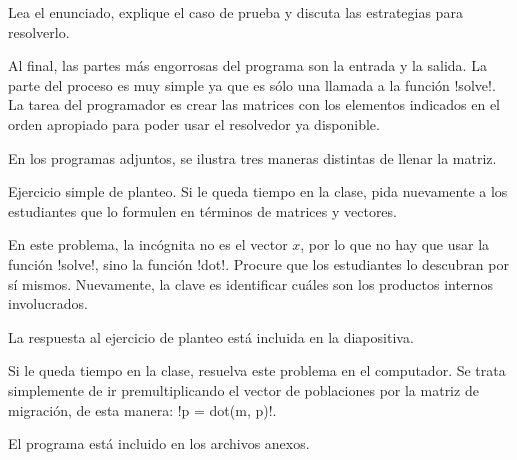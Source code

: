 \documentclass[10pt]{article}
\begin{document}
  Lea el enunciado, explique el caso de prueba
  y discuta las estrategias para resolverlo.

  Al final,
  las partes más engorrosas del programa son la entrada y la salida.
  La parte del proceso es muy simple
  ya que es sólo una llamada a la función \li!solve!.
  La tarea del programador es crear las matrices con los elementos indicados
  en el orden apropiado para poder usar el resolvedor ya disponible.

  En los programas adjuntos,
  se ilustra tres maneras distintas de llenar la matriz.


  Ejercicio simple de planteo.
  Si le queda tiempo en la clase,
  pida nuevamente a los estudiantes que lo formulen
  en términos de matrices y vectores.

  En este problema,
  la incógnita no es el vector \(x\),
  por lo que no hay que usar la función \li!solve!,
  sino la función \li!dot!.
  Procure que los estudiantes lo descubran por sí mismos.
  Nuevamente, la clave es identificar cuáles son los productos internos involucrados.

  La respuesta al ejercicio de planteo está incluida en la diapositiva.


  Si le queda tiempo en la clase,
  resuelva este problema en el computador.
  Se trata simplemente de ir premultiplicando el vector de poblaciones
  por la matriz de migración,
  de esta manera: \li!p = dot(m, p)!.

  El programa está incluido en los archivos anexos.
\end{document}
